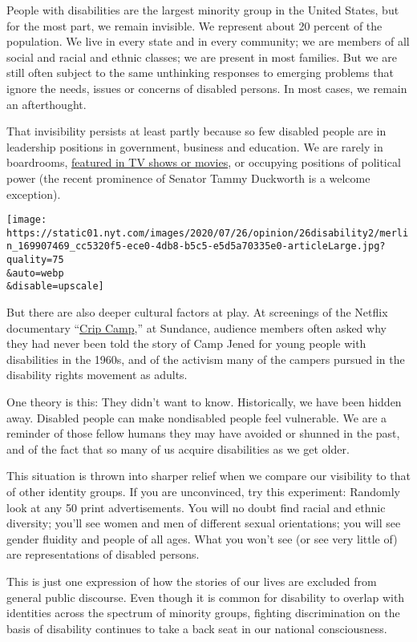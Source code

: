 People with disabilities are the largest minority group in the United
States, but for the most part, we remain invisible. We represent about
20 percent of the population. We live in every state and in every
community; we are members of all social and racial and ethnic classes;
we are present in most families. But we are still often subject to the
same unthinking responses to emerging problems that ignore the needs,
issues or concerns of disabled persons. In most cases, we remain an
afterthought.

That invisibility persists at least partly because so few disabled
people are in leadership positions in government, business and
education. We are rarely in boardrooms,
\href{https://www.nytimes.com/2020/07/19/arts/after-oscarssowhite-disability-waits-for-its-moment.html}{featured
in TV shows or movies}, or occupying positions of political power (the
recent prominence of Senator Tammy Duckworth is a welcome exception).

\texttt{[image: https://static01.nyt.com/images/2020/07/26/opinion/26disability2/merlin\_169907469\_cc5320f5-ece0-4db8-b5c5-e5d5a70335e0-articleLarge.jpg?quality=75\\\&auto=webp\\\&disable=upscale]}

But there are also deeper cultural factors at play. At screenings of the
Netflix documentary
``\href{https://www.nytimes.com/2020/03/24/movies/crip-camp-review.html}{Crip
Camp},'' at Sundance, audience members often asked why they had never
been told the story of Camp Jened for young people with disabilities in
the 1960s, and of the activism many of the campers pursued in the
disability rights movement as adults.

One theory is this: They didn't want to know. Historically, we have been
hidden away. Disabled people can make nondisabled people feel
vulnerable. We are a reminder of those fellow humans they may have
avoided or shunned in the past, and of the fact that so many of us
acquire disabilities as we get older.

This situation is thrown into sharper relief when we compare our
visibility to that of other identity groups. If you are unconvinced, try
this experiment: Randomly look at any 50 print advertisements. You will
no doubt find racial and ethnic diversity; you'll see women and men of
different sexual orientations; you will see gender fluidity and people
of all ages. What you won't see (or see very little of) are
representations of disabled persons.

This is just one expression of how the stories of our lives are excluded
from general public discourse. Even though it is common for disability
to overlap with identities across the spectrum of minority groups,
fighting discrimination on the basis of disability continues to take a
back seat in our national consciousness.

